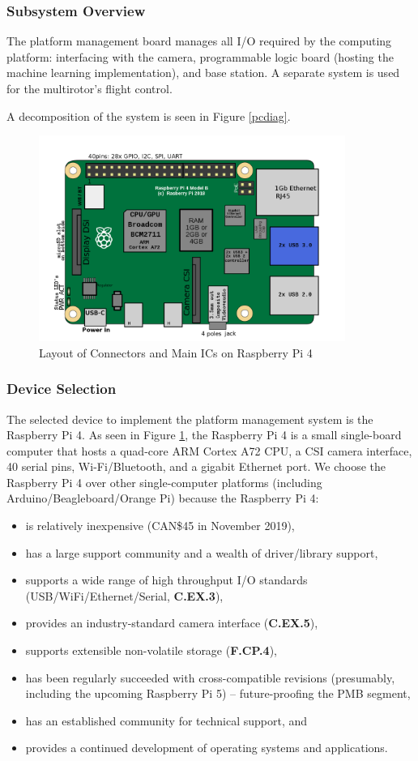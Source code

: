 \subsubsection{Subsystem Overview}
The platform management board manages all I/O required by the computing platform: interfacing with the camera, programmable logic board (hosting the machine learning implementation), and base station. A separate system is used for the multirotor's flight control.

A decomposition of the system is seen in Figure \ref{pcdiag}.

\begin{figure}[H]
\centering
\includegraphics[width=10cm]{img/RaspberryPi_Model_4B.png}
\caption[Layout of Connectors and Main ICs on Raspberry Pi 4]{Layout of Connectors and Main ICs on Raspberry Pi 4\cite{rpidiag}}
\label{rpi}
\end{figure}

\subsubsection{Device Selection}
The selected device to implement the platform management system is the Raspberry Pi 4. As seen in Figure \ref{rpi}, the Raspberry Pi 4 is a small single-board computer that hosts a quad-core ARM Cortex A72 CPU, a CSI camera interface, 40 serial pins, Wi-Fi/Bluetooth, and a gigabit Ethernet port. We choose the Raspberry Pi 4 over other single-computer platforms (including Arduino/Beagleboard/Orange Pi) because the Raspberry Pi 4:
\begin{itemize}
\item is relatively inexpensive (CAN\$45 in November 2019),
\item has a large support community and a wealth of driver/library support,
\item supports a wide range of high throughput I/O standards (USB/WiFi/Ethernet/Serial, \textbf{C.EX.3}),
\item provides an industry-standard camera interface (\textbf{C.EX.5}),
\item supports extensible non-volatile storage (\textbf{F.CP.4}),
\item has been regularly succeeded with cross-compatible revisions (presumably, including the upcoming Raspberry Pi 5) -- future-proofing the PMB segment,
\item has an established community for technical support, and
\item provides a continued development of operating systems and applications.
\end{itemize} 


